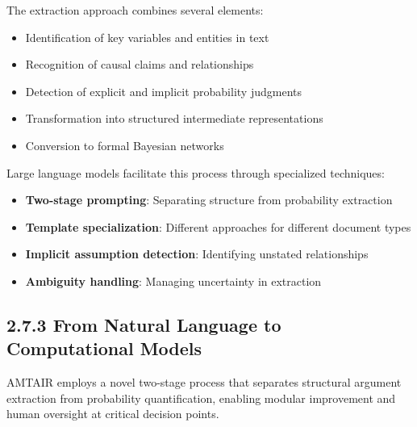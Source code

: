 \documentclass[
  11pt,
  letterpaper,
]{book}
\providecommand{\tightlist}{%
  \setlength{\itemsep}{0pt}\setlength{\parskip}{0pt}}
\begin{document}
The extraction approach combines several elements:

\begin{itemize}
\tightlist
\item
  Identification of key variables and entities in text
\item
  Recognition of causal claims and relationships
\item
  Detection of explicit and implicit probability judgments
\item
  Transformation into structured intermediate representations
\item
  Conversion to formal Bayesian networks
\end{itemize}

Large language models facilitate this process through specialized
techniques:

\begin{itemize}
\tightlist
\item
  \textbf{Two-stage prompting}: Separating structure from probability
  extraction
\item
  \textbf{Template specialization}: Different approaches for different
  document types
\item
  \textbf{Implicit assumption detection}: Identifying unstated
  relationships
\item
  \textbf{Ambiguity handling}: Managing uncertainty in extraction
\end{itemize}

\subsection*{2.7.3 From Natural Language to Computational
Models}\label{sec-natural-to-computational}

\begin{tcolorbox}[enhanced jigsaw, opacityback=0, leftrule=.75mm, breakable, coltitle=black, colbacktitle=quarto-callout-tip-color!10!white, bottomrule=.15mm, rightrule=.15mm, toprule=.15mm, left=2mm, bottomtitle=1mm, arc=.35mm, toptitle=1mm, titlerule=0mm, title=\textcolor{quarto-callout-tip-color}{\faLightbulb}\hspace{0.5em}{The Two-Stage Extraction Process}, opacitybacktitle=0.6, colframe=quarto-callout-tip-color-frame, colback=white]

AMTAIR employs a novel two-stage process that separates structural
argument extraction from probability quantification, enabling modular
improvement and human oversight at critical decision points.

\end{tcolorbox}
\end{document}
